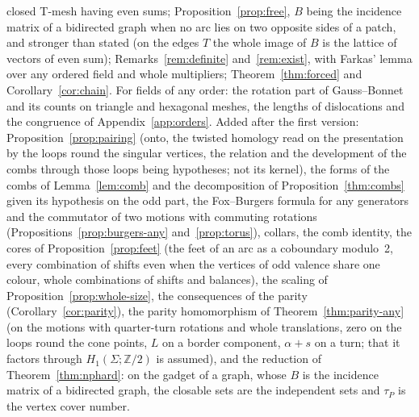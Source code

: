 \documentclass[11pt,a4paper]{article}
\newcommand{\Z}{\mathbb{Z}}
\begin{document}
closed T-mesh having even sums; Proposition~\ref{prop:free}, $B$ being the
incidence matrix of a bidirected graph when no arc lies on two opposite sides
of a patch, and
stronger than stated (on the edges $T$ the whole image of $B$ is the lattice
of vectors of even sum); Remarks~\ref{rem:definite} and~\ref{rem:exist}, with
Farkas' lemma over any ordered field and whole multipliers;
Theorem~\ref{thm:forced} and Corollary~\ref{cor:chain}. For fields of any
order: the rotation part of Gauss--Bonnet and its counts on triangle and
hexagonal meshes, the lengths of dislocations and the congruence of
Appendix~\ref{app:orders}. Added after the first version: Proposition~\ref{prop:pairing}
(onto, the twisted homology read on the presentation by the loops round the
singular vertices, the relation and the development of the combs through
those loops being hypotheses; not its kernel), the forms of the combs of
Lemma~\ref{lem:comb} and the decomposition of Proposition~\ref{thm:combs}
given its hypothesis on the odd part, the Fox--Burgers
formula for any generators and the commutator of two motions with commuting
rotations (Propositions~\ref{prop:burgers-any} and~\ref{prop:torus}), collars,
the comb identity, the cores of Proposition~\ref{prop:feet} (the feet of an
arc as a coboundary modulo~2, every combination of shifts even when the
vertices of odd valence share one colour, whole combinations of shifts and
balances), the scaling of Proposition~\ref{prop:whole-size}, the
consequences of the parity (Corollary~\ref{cor:parity}), the parity
homomorphism of Theorem~\ref{thm:parity-any} (on the motions with quarter-turn
rotations and whole translations, zero on the loops round the cone points,
$L$ on a border component, $\alpha + s$ on a turn; that it factors through
$H_1(\Sigma; \Z/2)$ is assumed), and the reduction of
Theorem~\ref{thm:nphard}: on the gadget of a graph, whose $B$ is the
incidence matrix of a bidirected graph, the closable sets are the independent
sets and $\tau_P$ is the vertex cover number.
\end{document}
